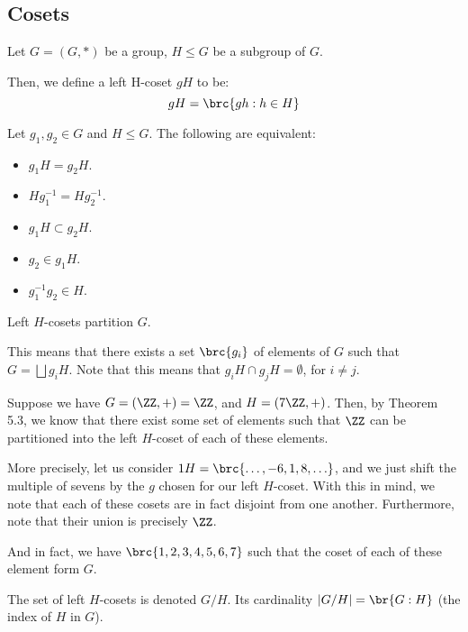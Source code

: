 \documentclass[openany]{book}
\begin{document}
\subsection{Cosets}
\begin{defn}[Cosets]
	Let $G = (G, *)$ be a group, $H \leq G$ be a subgroup of $G$.
	
	Then, we define a left H-coset $gH$ to be:
	\begin{equation*}
		gH = \brc{gh : h \in H}
	\end{equation*}
\end{defn}

\begin{lem}
	Let $g_1, g_2 \in G$ and $H \leq G$. The following are equivalent:
	\begin{itemize}
		\item $g_1H = g_2H$.
		\item $Hg_1^{-1} = Hg_2^{-1}$.
		\item $g_1H \subset g_2H$.
		\item $g_2 \in g_1H$.
		\item $g_1^{-1}g_2 \in H$.
	\end{itemize}
\end{lem}

\begin{thm}
	Left $H$-cosets partition $G$.
\end{thm}

This means that there exists a set $\brc{g_i}$ of elements of $G$ such that $G = \bigsqcup g_iH$. Note that this means that $g_i H \cap g_j H = \emptyset$, for $i \neq j$.

\begin{example}
	Suppose we have $G = (\ZZ, +) = \ZZ$, and $H = (7\ZZ, +)$. Then, by Theorem 5.3, we know that there exist some set of elements such that $\ZZ$ can be partitioned into the left $H$-coset of each of these elements. 
	
	More precisely, let us consider $1H = \brc{\ldots, -6, 1, 8, \ldots}$, and we just shift the multiple of sevens by the $g$ chosen for our left $H$-coset. With this in mind, we note that each of these cosets are in fact disjoint from one another. Furthermore, note that their union is precisely $\ZZ$.
	
	And in fact, we have $\brc{1, 2, 3, 4, 5, 6, 7}$ such that the coset of each of these element form $G$.
\end{example}

\begin{rmk}
	The set of left $H$-cosets is denoted $G / H$. Its cardinality $\lvert G/H \rvert = \br{G:H}$ (the index of $H$ in $G$).
\end{rmk}
\end{document}
